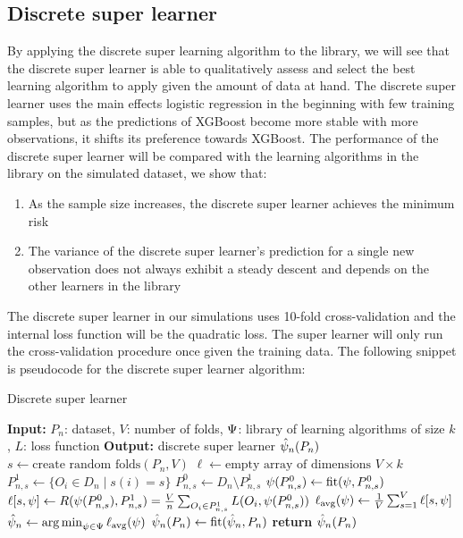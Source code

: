 \documentclass[./main.tex]{subfiles}
\begin{document}
\subsection{Discrete super learner}
By applying the discrete super learning algorithm to the library, we will see that the discrete super learner is able to qualitatively assess and select the best learning algorithm to apply given the amount of data at hand. The discrete super learner uses the main effects logistic regression in the beginning with few training samples, but as the predictions of XGBoost become more stable with more observations, it shifts its preference towards XGBoost. The performance of the discrete super learner will be compared with the learning algorithms in the library on the simulated dataset, we show that:
\begin{enumerate}
    \item As the sample size increases, the discrete super learner achieves the minimum risk 
    \item The variance of the discrete super learner's prediction for a single new observation does not always exhibit a steady descent and depends on the other learners in the library
\end{enumerate}
The discrete super learner in our simulations uses 10-fold cross-validation and the internal loss function will be the quadratic loss. The super learner will only run the cross-validation procedure once given the training data. The following snippet is pseudocode for the discrete super learner algorithm:
\begin{algorithm}[H]
\caption{Discrete super learner}
\begin{algorithmic}[1]
\State \textbf{Input:} $P_n$: dataset, $V$: number of folds, $ \Psi $: library of learning algorithms of size $ k $, $ L $: loss function
\State \textbf{Output:} discrete super learner $ \hat{\psi}_n(P_n) $
\State $s \gets \text{create random folds}(P_n, V)$ 
\State $\ell \gets \text{empty array of dimensions } V \times k$  
    \State $P_{n, s}^{1} \gets \{O_i \in D_n \mid s(i) = s\} $
    \State $P_{n, s}^{0} \gets D_n \setminus P_{n,s}^{1} $
    \For{$\la \in \lib$}
    \State $ \psi(P_{n,s}^{0}) \gets \text{fit}(\psi, P_{n, s}^{0})$
    \State $\ell[s,\psi] \gets R(\psi(P_{n, s}^{0}), P_{n,s}^{1}) = \frac{V}{n} \sum_{O_i \in P_{n,s}^{1}} L(O_i, \psi(P_{n, s}^{0})) $
    \EndFor
\EndFor
\State $ \ell_{\text{avg}}(\psi) \gets \frac{1}{V} \sum_{s = 1}^{V} \ell[s,\psi] $ 
\State $ \hat{\psi}_n \gets \operatorname*{arg\,min}_{\psi \in \Psi} \ell_{\text{avg}}(\psi) $
\State $ \hat{\psi}_n(P_n) \gets \text{fit}(\hat{\psi}_n, P_n) $  
\State \textbf{return} $ \hat{\psi}_n(P_n) $
\end{algorithmic}
\end{algorithm}
\end{document}
